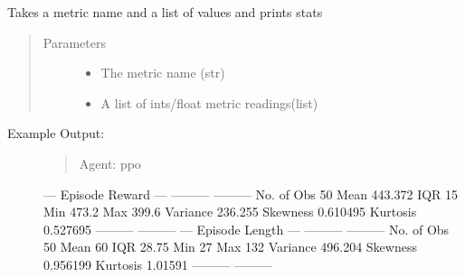 \documentclass[letterpaper,10pt,english]{sphinxmanual}
\begin{document}

\begin{fulllineitems}
\label{\detokenize{source/yawning_titan.experiment_helpers:yawning_titan.experiment_helpers.sb3.print_metric_stats}}
\sphinxAtStartPar
Takes a metric name and a list of values and
prints stats
\begin{quote}\begin{description}
\item[{Parameters}] \leavevmode\begin{itemize}
\item {}
\sphinxAtStartPar
{} \textendash{} The metric name (str)

\item {}
\sphinxAtStartPar
{} \textendash{} A list of ints/float metric readings(list)

\end{itemize}

\end{description}\end{quote}
\begin{description}
\item[{Example Output:}] \leavevmode\begin{quote}

\sphinxAtStartPar
Agent: ppo
\end{quote}

\sphinxAtStartPar
—\sphinxhyphen{} Episode Reward —\sphinxhyphen{}
———\sphinxhyphen{}  ———\textendash{}
No. of Obs    50
Mean        \sphinxhyphen{}443.372
IQR           15
Min         \sphinxhyphen{}473.2
Max         \sphinxhyphen{}399.6
Variance     236.255
Skewness       0.610495
Kurtosis       0.527695
———\sphinxhyphen{}  ———\textendash{}
—\sphinxhyphen{} Episode Length —\sphinxhyphen{}
———\sphinxhyphen{}  ———\sphinxhyphen{}
No. of Obs   50
Mean         60
IQR          28.75
Min          27
Max         132
Variance    496.204
Skewness      0.956199
Kurtosis      1.01591
———\sphinxhyphen{}  ———\sphinxhyphen{}

\end{description}

\end{fulllineitems}
\end{document}
